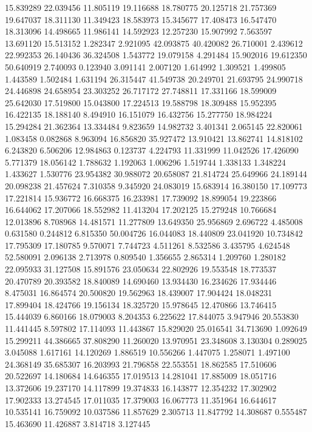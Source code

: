 15.839289
22.039456
11.805119
19.116688
18.780775
20.125718
21.757369
19.647037
18.311130
11.349423
18.583973
15.345677
17.408473
16.547470
18.313096
14.498665
11.986141
14.592923
12.257230
15.907992
7.563597
13.691120
15.513152
1.282347
2.921095
42.093875
40.420082
26.710001
2.439612
22.992353
26.140436
36.324508
1.543772
19.079158
4.291484
15.902016
19.612350
50.640919
2.740093
0.123940
3.091141
2.007120
1.614992
1.309521
1.499805
1.443589
1.502484
1.631194
26.315447
41.549738
20.249701
21.693795
24.990718
24.446898
24.658954
23.303252
26.717172
27.748811
17.331166
18.599009
25.642030
17.519800
15.043800
17.224513
19.588798
18.309488
15.952395
16.422135
18.188140
8.494910
16.151079
16.432756
15.277750
18.984224
15.294284
21.362364
13.334484
9.823659
14.982732
3.401341
2.065145
22.820061
1.083458
0.082868
8.963094
16.856820
35.927472
13.910421
13.862741
14.818102
6.243820
6.506206
12.984863
0.123737
4.224793
11.331999
11.042526
17.426090
5.771379
18.056142
1.788632
1.192063
1.006296
1.519744
1.338133
1.348224
1.433627
1.530776
23.954382
30.988072
20.658087
21.814724
25.649966
24.189144
20.098238
21.457624
7.310358
9.345920
24.083019
15.683914
16.380150
17.109773
17.221814
15.936772
16.668375
16.233981
17.739092
18.899054
19.223866
16.644062
17.207066
18.552982
11.413204
17.202125
15.279248
10.766684
12.013896
8.708968
14.481571
11.277809
13.649350
25.956869
2.696722
4.485008
0.631580
0.244812
6.815350
50.004726
16.044083
18.440809
23.041920
10.734842
17.795309
17.180785
9.570071
7.744723
4.511261
8.532586
3.435795
4.624548
52.580091
2.096138
2.713978
0.809540
1.356655
2.865314
1.209760
1.280182
22.095933
31.127508
15.891576
23.050634
22.802926
19.553548
18.773537
20.470789
20.393582
18.840089
14.690460
13.934430
16.234626
17.934446
8.475031
16.864574
20.500820
19.562963
18.439007
17.904424
18.048231
17.899404
18.424766
19.156134
18.325720
15.978645
12.470866
13.746415
15.444039
6.860166
18.079003
8.204353
6.225622
17.844075
3.947946
20.553830
11.441445
8.597802
17.114093
11.443867
15.829020
25.016541
34.713690
1.092649
15.299211
44.386665
37.808290
11.260020
13.970951
23.348608
3.130304
0.289025
3.045088
1.617161
14.120269
1.886519
10.556266
1.447075
1.258071
1.497100
24.368149
35.685307
16.203993
21.796858
22.553551
18.862585
17.510606
20.522697
14.180684
14.646355
17.019513
14.281041
17.885009
18.051716
13.372606
19.237170
14.117899
19.374833
16.143877
12.354232
17.302902
17.902333
13.274545
17.011035
17.379003
16.067773
11.351964
16.644617
10.535141
16.759092
10.037586
11.857629
2.305713
11.847792
14.308687
0.555487
15.463690
11.426887
3.814718
3.127445
